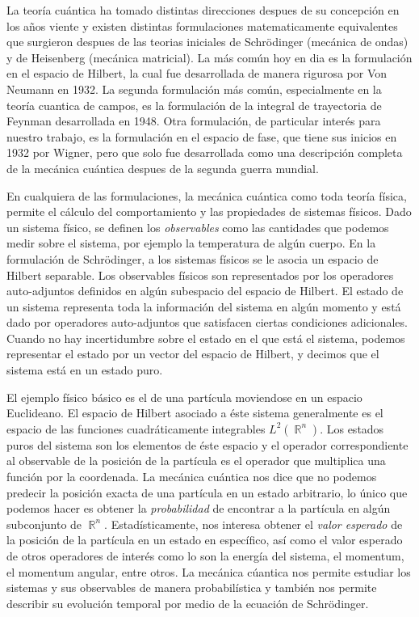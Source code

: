 \documentclass[a4paper]{report}
\DeclareMathOperator{\R}{\mathbb{R}}
\begin{document}
  La teoría cuántica ha tomado distintas direcciones despues
  de su concepción en los años viente y existen distintas
  formulaciones matematicamente equivalentes que surgieron
  despues de las teorias iniciales de Schrödinger (mecánica
  de ondas) y de Heisenberg (mecánica matricial).  La más
  común hoy en dia es la formulación en el espacio de
  Hilbert, la cual fue desarrollada de manera rigurosa por
  Von Neumann en 1932.  La segunda formulación más común,
  especialmente en la teoría cuantica de campos, es la
  formulación de la integral de trayectoria de Feynman
  desarrollada en 1948.  Otra formulación, de particular
  interés para nuestro trabajo, es la formulación en el
  espacio de fase, que tiene sus inicios en 1932 por Wigner,
  pero que solo fue desarrollada como una descripción
  completa de la mecánica cuántica despues de la segunda
  guerra mundial. 

  En cualquiera de las formulaciones, la mecánica cuántica
  como toda teoría física, permite el cálculo del
  comportamiento y las propiedades de sistemas físicos. Dado
  un sistema físico, se definen los \textit{observables}
  como las cantidades que podemos medir sobre el sistema,
  por ejemplo la temperatura de algún cuerpo. En la
  formulación de Schrödinger, a los sistemas físicos se le
  asocia un espacio de Hilbert separable. Los observables
  físicos son representados por los operadores auto-adjuntos
  definidos en algún subespacio del espacio de Hilbert. El
  estado de un sistema representa toda la información del
  sistema en algún momento y está dado por operadores
  auto-adjuntos que satisfacen ciertas condiciones
  adicionales. Cuando no hay incertidumbre sobre el estado
  en el que está el sistema, podemos representar el estado
  por un vector del espacio de Hilbert, y decimos que el
  sistema está en un estado puro.

  El ejemplo físico básico es el de una partícula moviendose
  en un espacio Euclideano. El espacio de Hilbert asociado a
  éste sistema generalmente es el espacio de las funciones
  cuadráticamente integrables $L^2(\R^{n})$. Los estados
  puros del sistema son los elementos de éste espacio y el
  operador correspondiente al observable de la posición de
  la partícula es el operador que multiplica una función por
  la coordenada. La mecánica cuántica nos dice que no
  podemos predecir la posición exacta de una partícula en un
  estado arbitrario, lo único que podemos hacer es obtener
  la \textit{probabilidad} de encontrar a la partícula en
  algún subconjunto de $\R^{n}$.  Estadísticamente, nos
  interesa obtener el \textit{valor esperado} de la posición
  de la partícula en un estado en específico, así como el
  valor esperado de otros operadores de interés como lo son
  la energía del sistema, el momentum, el momentum angular,
  entre otros. La mecánica cúantica nos permite estudiar los
  sistemas y sus observables de manera probabilística y
  también nos permite describir su evolución temporal por
  medio de la ecuación de Schrödinger. 
  
\end{document}
